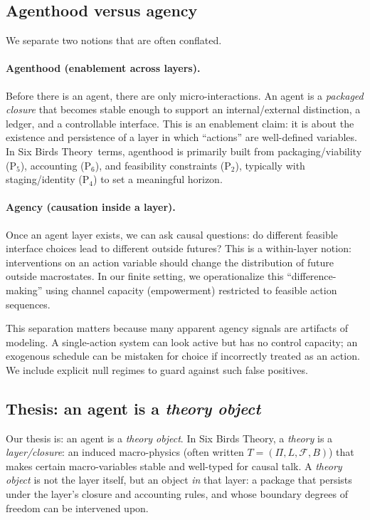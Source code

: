 \documentclass[11pt]{article}
\newcommand{\SBT}{Six Birds Theory}
\begin{document}
\subsection{Agenthood versus agency}
We separate two notions that are often conflated.

\paragraph{Agenthood (enablement across layers).}
Before there is an agent, there are only micro-interactions. An agent is a \emph{packaged closure} that becomes stable enough to support an internal/external distinction, a ledger, and a controllable interface. This is an enablement claim: it is about the existence and persistence of a layer in which ``actions'' are well-defined variables. In \SBT\ terms, agenthood is primarily built from packaging/viability (P$_5$), accounting (P$_6$), and feasibility constraints (P$_2$), typically with staging/identity (P$_4$) to set a meaningful horizon.

\paragraph{Agency (causation inside a layer).}
Once an agent layer exists, we can ask causal questions: do different feasible interface choices lead to different outside futures? This is a within-layer notion: interventions on an action variable should change the distribution of future outside macrostates. In our finite setting, we operationalize this ``difference-making'' using channel capacity (empowerment) restricted to feasible action sequences.

This separation matters because many apparent agency signals are artifacts of modeling. A single-action system can look active but has no control capacity; an exogenous schedule can be mistaken for choice if incorrectly treated as an action. We include explicit null regimes to guard against such false positives.

\subsection{Thesis: an agent is a \emph{theory object}}
Our thesis is: an agent is a \emph{theory object}. In \SBT, a \emph{theory} is a \emph{layer/closure}: an induced macro-physics (often written $T=(\Pi,L,\mathcal F,B)$) that makes certain macro-variables stable and well-typed for causal talk. A \emph{theory object} is not the layer itself, but an object \emph{in} that layer: a package that persists under the layer's closure and accounting rules, and whose boundary degrees of freedom can be intervened upon.
\end{document}
